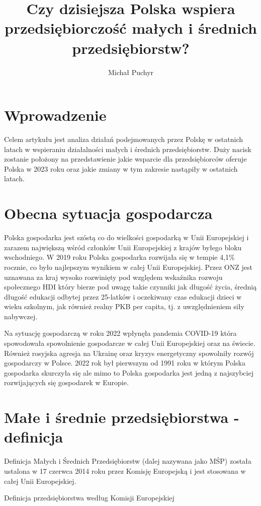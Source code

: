 \documentclass[11pt]{article}
\author{Michał Puchyr}
\date{}
\title{\textbf{Czy dzisiejsza Polska wspiera przedsiębiorczość małych i średnich przedsiębiorstw?}}
\begin{document}
\maketitle
\section*{Wprowadzenie}
Celem artykułu jest analiza działań podejmowanych przez Polskę w ostatnich latach w wspieraniu działalności małych i średnich przedsiębiorstw.
Duży nacisk zostanie położony na przedstawienie jakie wsparcie dla przedsiębiorców oferuje Polska w 2023 roku 
oraz jakie zmiany w tym zakresie nastąpiły w ostatnich latach.

\section*{Obecna sytuacja gospodarcza}
Polska gospodarka jest szóstą co do wielkości gospodarką w Unii Europejskiej i zarazem największą wśród członków Unii Europejskiej z krajów byłego bloku wschodniego.
W 2019 roku Polska gospodarka rozwijała się w tempie 4,1\% rocznie, co było najlepszym wynikiem w całej Unii Europejskiej.
Przez ONZ jest uznawana za kraj wysoko rozwinięty pod względem wskaźnika rozwoju społecznego HDI który 
bierze pod uwagę takie czynniki jak długość życia, średnią długość edukacji odbytej
przez 25-latków i oczekiwany czas edukacji dzieci w wieku szkolnym, jak również realny PKB per capita, tj. z uwzględnieniem siły nabywczej.

Na sytuację gospodarczą w roku 2022 wpłynęła pandemia COVID-19 która spowodowała spowolnienie gospodarcze w całej Unii Europejskiej oraz na świecie.
Również rosyjska agresja na Ukrainę oraz kryzys energetyczny spowolniły rozwój gospodarczy w Polsce.
2022 rok był pierwszym od 1991 roku w którym Polska gospodarka skurczyła się ale mimo to Polska gospodarka jest jedną z najszybciej rozwijających się gospodarek w Europie.


\section*{Małe i średnie przedsiębiorstwa - definicja}
Definicja Małych i Średnich Przedsiębiorstw (dalej nazywana jako MŚP) została ustalona w 17 czerwca 2014 roku przez Komisję Europejską i jest stosowana w całej Unii Europejskiej.

Definicja przedsiębiorstwa według Komisji Europejskiej \cite{Komisja}
\end{document}
